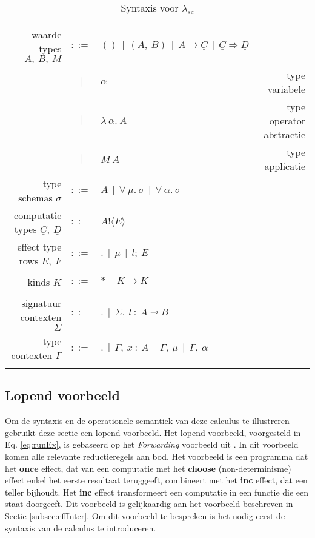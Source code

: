 \begin{table}
\begin{tabular}{|r c l r|}
         & & & \\
         waarde types $A, \: B, \: M$ & $::=$ & $() \: \: | \: \: (A, \:B) \: \: | \: \: A \rightarrow \underline{C} \: \: | \: \: \underline{C} \Rightarrow \underline{D}$ & \\
         & $|$ & $\alpha$ & type variabele \\
         & $|$ & $\lambda \: \alpha . \: A$ & type operator abstractie \\
         & $|$ & $M \: A$ & type applicatie \\
         type schemas $\sigma$ & $::=$ & $A \: \: | \: \: \forall \: \mu . \: \sigma \: \: | \: \: \forall \: \alpha. \: \sigma $ & \\
         computatie types $\underline{C}, \: \underline{D}$ & $::=$ & $A ! \langle E \rangle $ & \\
         effect type rows $E, \: F$ & $::=$ & $. \: \: | \: \: \mu \: \: | \: \: l; \: E $ & \\
         & & & \\
         kinds $K$ & $::=$ & $* \: \: | \: \: K \rightarrow K$ & \\
         & & & \\
         signatuur contexten $\Sigma$ & $::=$ & $. \: \: | \: \: \Sigma , \: l \: : \: A \rightarrowtriangle B$ & \\
         type contexten $\Gamma$ & $::=$ & $. \: \: | \:\: \Gamma, \: x \: : \: A \: \: | \: \: \Gamma , \: \mu \: \: | \: \: \Gamma, \: \alpha $ & \\
         & & & \\
    \hline
    \end{tabular}
    \caption{Syntaxis voor $\lambda_{sc}$}
    \label{fig:syntaxisScoped}
\end{table}

\subsection{Lopend voorbeeld}
Om de syntaxis en de operationele semantiek van deze calculus te illustreren gebruikt deze sectie een lopend voorbeeld. 
Het lopend voorbeeld, voorgesteld in Eq. \ref{eq:runEx}, is gebaseerd op het \emph{Forwarding} voorbeeld uit \cite{Bosman2022}. In dit voorbeeld komen alle relevante reductieregels aan bod. Het voorbeeld is een programma dat het \textbf{once} effect, dat van een computatie met het \textbf{choose} (non-determinisme) effect enkel het eerste resultaat teruggeeft, combineert met het \textbf{inc} effect, dat een teller bijhoudt. Het \textbf{inc} effect transformeert een computatie in een functie die een staat doorgeeft. Dit voorbeeld is gelijkaardig aan het voorbeeld beschreven in Sectie \ref{subsec:effInter}. Om dit voorbeeld te bespreken is het nodig eerst de syntaxis van de calculus te introduceren.

